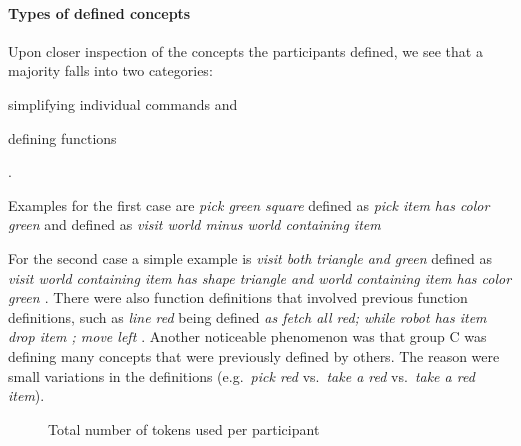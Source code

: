 \paragraph*{\textbf{Types of defined concepts}} 
Upon closer inspection of the concepts the participants defined, we see that a majority falls into two categories: 
\begin{inparaenum}[(1)]
\item simplifying individual commands and
\item defining functions 
\end{inparaenum}.

Examples for the first case are  
\textit{pick green square} defined as \textit{pick item has color green} and 
 defined as \textit{visit world minus {world containing item}}

For the second case a simple example is 
\textit{visit both triangle and green
} defined as \textit{ visit { { world containing item has shape triangle } and { world containing item has color green } }}. There were also function definitions that involved previous function definitions, such as \textit{line red} being defined \textit{as fetch all red; while { robot has item } { drop item ; move left }}.  Another noticeable phenomenon was that group C was defining many concepts that were previously defined by others. The reason were small variations in the definitions (e.g.\ \emph{pick red} vs.\ \emph{take a red} vs.\ \emph{take a red item}). 


 


\begin{figure}[t!]
		
	\caption{Total number of tokens used per participant}
	\label{fig:numTokens}
	\end{figure}



